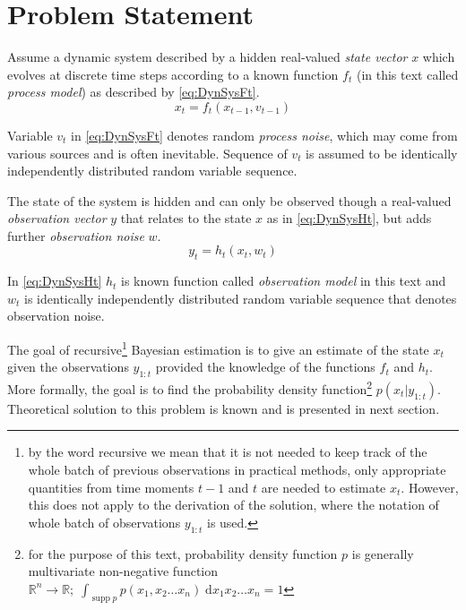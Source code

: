\documentclass[a4paper,12pt,oneside]{report}
\newcommand{\pdf}{probability density function}
\newcommand{\supp}{\operatorname{supp}}
\begin{document}
\section{Problem Statement}

Assume a dynamic system described by a hidden real-valued \emph{state vector} \(x\) which evolves at
discrete time steps according to a known function \(f_t\) (in this text called \emph{process model})
as described by \eqref{eq:DynSysFt}.
\begin{equation} \label{eq:DynSysFt}
	x_t = f_t(x_{t-1}, v_{t-1})
\end{equation}

Variable \(v_t\) in \eqref{eq:DynSysFt} denotes random \emph{process noise}, which may come from various
sources and is often inevitable. Sequence of \(v_t\) is assumed to be identically independently
distributed random variable sequence.

The state of the system is hidden and can only be observed though a real-valued \emph{observation vector}
\(y\) that relates to the state \(x\) as in \eqref{eq:DynSysHt}, but adds further \emph{observation
noise} \(w\).
\begin{equation} \label{eq:DynSysHt}
	y_t = h_t(x_t, w_t)
\end{equation}

In \eqref{eq:DynSysHt} \(h_t\) is known function called \emph{observation model} in this text and \(w_t\) is
identically independently distributed random variable sequence that denotes observation noise.

The goal of recursive\footnote{by the word recursive we mean that it is not needed to keep track of
the whole batch of previous observations in practical methods, only appropriate quantities from time
moments \(t-1\) and \(t\) are needed to estimate \(x_t\). However, this does not apply to the
derivation of the solution, where the notation of whole batch of observations \(y_{1:t}\) is used.}
Bayesian estimation is to give an estimate of the state \(x_t\) given the
observations \(y_{1:t}\) provided the knowledge of the functions \(f_t\) and \(h_t\).
More formally, the goal is to find the probability density function\footnote{for the purpose of this %
text, {\pdf} \(p\) is generally multivariate non-negative function \(\mathbb{R}^n \rightarrow
\mathbb{R}; \; \int_{\supp p} p(x_1, x_2 \dots x_n)  \; \mathrm{d} x_1 x_2 \dots x_n = 1\)}
\(p(x_t | y_{1:t})\).
Theoretical solution to this problem is known and is presented in next section.
\end{document}

